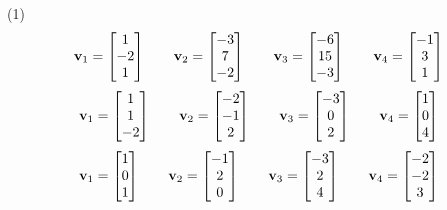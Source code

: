 \begin{tasks}[resume, style=enumerate](1)
\task
  \begin{align*}
    \mathbf v_{1} = \begin{bmatrix} 1 \\ -2 \\ 1 \end{bmatrix}
    \qquad
    \mathbf v_{2} = \begin{bmatrix} -3 \\ 7 \\ -2 \end{bmatrix}
    \qquad
    \mathbf v_{3} = \begin{bmatrix} -6 \\ 15 \\ -3 \end{bmatrix}
    \qquad
    \mathbf v_{4} = \begin{bmatrix} -1 \\ 3 \\ 1 \end{bmatrix}
  \end{align*}
\task
  \begin{align*}
    \mathbf v_{1} = \begin{bmatrix} 1 \\ 1 \\ -2 \end{bmatrix}
    \qquad
    \mathbf v_{2} = \begin{bmatrix} -2 \\ -1 \\ 2 \end{bmatrix}
    \qquad
    \mathbf v_{3} = \begin{bmatrix} -3 \\ 0 \\ 2 \end{bmatrix}
    \qquad
    \mathbf v_{4} = \begin{bmatrix} 1 \\ 0 \\ 4 \end{bmatrix}
  \end{align*}
\task
  \begin{displaymath}
    \mathbf v_1 = \begin{bmatrix} 1 \\ 0 \\ 1 \end{bmatrix}
    \qquad
    \mathbf v_2 = \begin{bmatrix} -1 \\ 2 \\ 0 \end{bmatrix}
    \qquad
    \mathbf v_3 = \begin{bmatrix} -3 \\ 2 \\ 4 \end{bmatrix}
    \qquad
    \mathbf v_4 = \begin{bmatrix} -2 \\ -2 \\ 3 \end{bmatrix}
  \end{displaymath}
\end{tasks}

